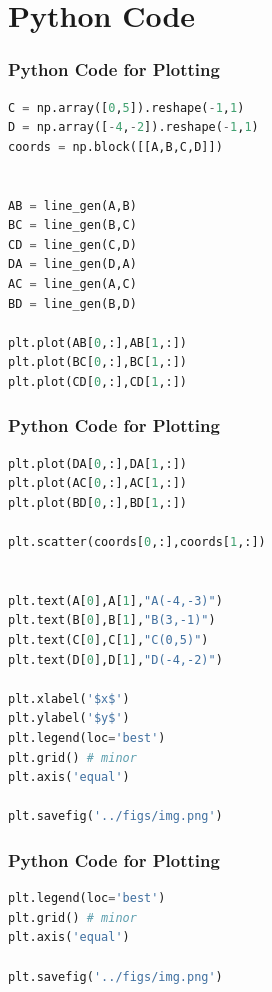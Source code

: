 \documentclass{beamer}
\theoremstyle{remark}
\numberwithin{equation}{section}
\begin{document}
\section{Python Code}
\begin{frame}[fragile]
\frametitle{Python Code for Plotting}
\begin{lstlisting}[language=Python]
C = np.array([0,5]).reshape(-1,1)
D = np.array([-4,-2]).reshape(-1,1)
coords = np.block([[A,B,C,D]])


AB = line_gen(A,B)
BC = line_gen(B,C)
CD = line_gen(C,D)
DA = line_gen(D,A)
AC = line_gen(A,C)
BD = line_gen(B,D)

plt.plot(AB[0,:],AB[1,:])
plt.plot(BC[0,:],BC[1,:])
plt.plot(CD[0,:],CD[1,:])

\end{lstlisting}

\end{frame}
\begin{frame}[fragile]
\frametitle{Python Code for Plotting}
\begin{lstlisting}[language=Python]
plt.plot(DA[0,:],DA[1,:])
plt.plot(AC[0,:],AC[1,:])
plt.plot(BD[0,:],BD[1,:])

plt.scatter(coords[0,:],coords[1,:])


plt.text(A[0],A[1],"A(-4,-3)")
plt.text(B[0],B[1],"B(3,-1)")
plt.text(C[0],C[1],"C(0,5)")
plt.text(D[0],D[1],"D(-4,-2)")

plt.xlabel('$x$')
plt.ylabel('$y$')
plt.legend(loc='best')
plt.grid() # minor
plt.axis('equal')

plt.savefig('../figs/img.png')


\end{lstlisting}

\end{frame}
\begin{frame}[fragile]
\frametitle{Python Code for Plotting}
\begin{lstlisting}[language=Python]
plt.legend(loc='best')
plt.grid() # minor
plt.axis('equal')

plt.savefig('../figs/img.png')

\end{lstlisting}

\end{frame}
\end{document}
